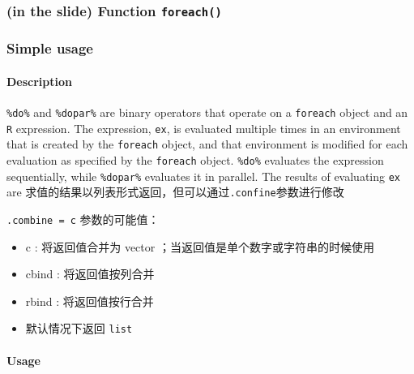 \documentclass[
]{article}
\begin{document}
\hypertarget{in-the-slide-function-foreach}{%
\subsubsection{\texorpdfstring{(in the slide) Function
\texttt{foreach()}}{(in the slide) Function foreach()}}\label{in-the-slide-function-foreach}}

\hypertarget{simple-usage}{%
\subsubsection{Simple usage}\label{simple-usage}}

\hypertarget{description-3}{%
\paragraph{Description}\label{description-3}}

\texttt{⁠\%do\%⁠} and \texttt{⁠\%dopar\%⁠} are binary operators that operate
on a \texttt{foreach} object and an \texttt{R} expression. The
expression, \texttt{ex}, is evaluated multiple times in an environment
that is created by the \texttt{foreach} object, and that environment is
modified for each evaluation as specified by the \texttt{foreach}
object. \texttt{⁠\%do\%⁠} evaluates the expression sequentially, while
\texttt{⁠\%dopar\%⁠} evaluates it in parallel. The results of evaluating
\texttt{ex} are
求值的结果以列表形式返回，但可以通过\texttt{.confine}参数进行修改

\texttt{.combine\ =\ \textquotesingle{}c\textquotesingle{}}
参数的可能值：

\begin{itemize}
\item
  \textquotesingle c\textquotesingle{} : 将返回值合并为 vector
  ；当返回值是单个数字或字符串的时候使用
\item
  \textquotesingle cbind\textquotesingle{} : 将返回值按列合并
\item
  \textquotesingle rbind\textquotesingle{} : 将返回值按行合并
\item
  默认情况下返回 \texttt{list}
\end{itemize}

\hypertarget{usage-2}{%
\paragraph{Usage}\label{usage-2}}
\end{document}

